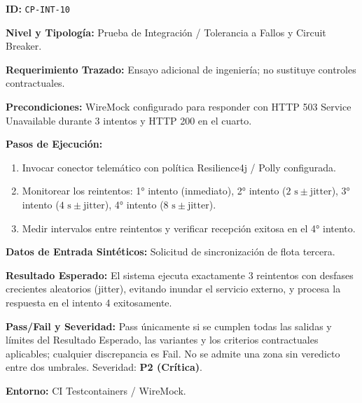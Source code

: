 \par\noindent\textbf{ID:} \texttt{C\allowbreak{}P\allowbreak{}-\allowbreak{}I\allowbreak{}N\allowbreak{}T\allowbreak{}-\allowbreak{}1\allowbreak{}0\allowbreak{}}\par
\par\noindent\textbf{Nivel y Tipología:} Prueba de Integración / Tolerancia a Fallos y Circuit Breaker.\par
\par\noindent\textbf{Requerimiento Trazado:} Ensayo adicional de ingeniería; no sustituye controles contractuales.\par
\par\noindent\textbf{Precondiciones:} WireMock configurado para responder con HTTP 503 Service Unavailable durante 3 intentos y HTTP 200 en el cuarto.\par
\par\noindent\textbf{Pasos de Ejecución:} \par
\begin{enumerate}
\item Invocar conector telemático con política Resilience4j / Polly configurada.
\item Monitorear los reintentos: 1° intento (inmediato), 2° intento (\(2\text{ s} \pm \text{jitter}\)), 3° intento (\(4\text{ s} \pm \text{jitter}\)), 4° intento (\(8\text{ s} \pm \text{jitter}\)).
\item Medir intervalos entre reintentos y verificar recepción exitosa en el 4° intento.
\end{enumerate}
\par\noindent\textbf{Datos de Entrada Sintéticos:} Solicitud de sincronización de flota tercera.\par
\par\noindent\textbf{Resultado Esperado:} El sistema ejecuta exactamente 3 reintentos con desfases crecientes aleatorios (jitter), evitando inundar el servicio externo, y procesa la respuesta en el intento 4 exitosamente.\par
\par\noindent\textbf{Pass/Fail y Severidad:} Pass únicamente si se cumplen todas las salidas y límites del Resultado Esperado, las variantes y los criterios contractuales aplicables; cualquier discrepancia es Fail. No se admite una zona sin veredicto entre dos umbrales. Severidad: \textbf{P2 (Crítica)}.\par
\par\noindent\textbf{Entorno:} CI Testcontainers / WireMock.\par






